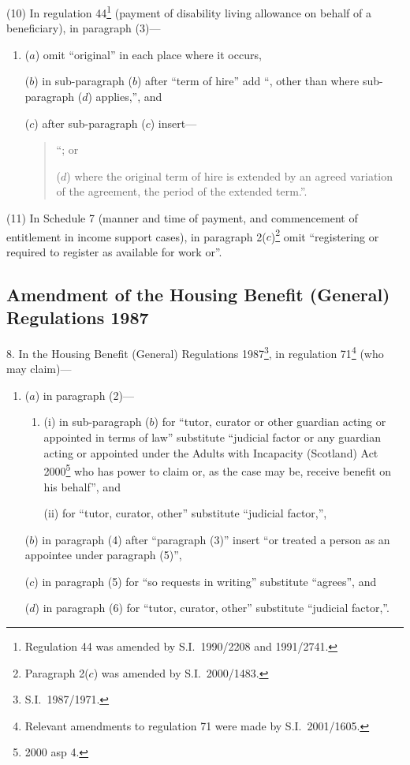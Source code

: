 \documentclass[12pt,a4paper]{article}
\begin{document}
(10) In regulation 44\footnote{Regulation 44 was amended by S.I.\ 1990/2208 and 1991/2741.} (payment of disability living allowance on behalf of a beneficiary), in paragraph (3)—
\begin{enumerate}\item[]
($a$) omit “original” in each place where it occurs,

($b$) in sub-paragraph ($b$)  after “term of hire” add “, other than where sub-paragraph ($d$)  applies,”, and

($c$) after sub-paragraph ($c$)  insert—
\begin{quotation}
“; or

($d$) where the original term of hire is extended by an agreed variation of the agreement, the period of the extended term.”.
\end{quotation}
\end{enumerate}

(11) In Schedule 7 (manner and time of payment, and commencement of entitlement in income support cases), in paragraph 2($c$)\footnote{Paragraph 2($c$) was amended by S.I.\ 2000/1483.} omit “registering or required to register as available for work or”.

\subsection[8. Amendment of the Housing Benefit (General) Regulations 1987]{\sloppy Amendment of the Housing Benefit (General) Regulations 1987}

8.  In the Housing Benefit (General) Regulations 1987\footnote{S.I.\ 1987/1971.}, in regulation 71\footnote{Relevant amendments to regulation 71 were made by S.I.\ 2001/1605.} (who may claim)—
\begin{enumerate}\item[]
($a$) in paragraph (2)—
\begin{enumerate}\item[]
(i) in sub-paragraph ($b$)  for “tutor, curator or other guardian acting or appointed in terms of law” substitute “judicial factor or any guardian acting or appointed under the Adults with Incapacity (Scotland) Act 2000\footnote{2000 asp 4.} who has power to claim or, as the case may be, receive benefit on his behalf”, and

(ii) for “tutor, curator, other” substitute “judicial factor,”,
\end{enumerate}

($b$) in paragraph (4) after “paragraph (3)” insert “or treated a person as an appointee under paragraph (5)”,

($c$) in paragraph (5) for “so requests in writing” substitute “agrees”, and

($d$) in paragraph (6) for “tutor, curator, other” substitute “judicial factor,”.
\end{enumerate}
\end{document}

